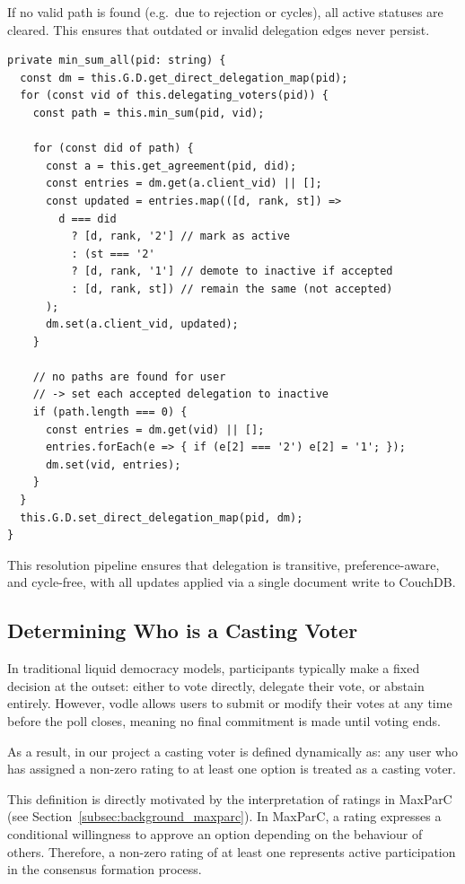 If no valid path is found (e.g.\ due to rejection or cycles), all active statuses are cleared. This ensures that outdated or invalid delegation edges never persist.

\begin{verbatim}
private min_sum_all(pid: string) {
  const dm = this.G.D.get_direct_delegation_map(pid);
  for (const vid of this.delegating_voters(pid)) {
    const path = this.min_sum(pid, vid);

    for (const did of path) {
      const a = this.get_agreement(pid, did);
      const entries = dm.get(a.client_vid) || [];
      const updated = entries.map(([d, rank, st]) =>
        d === did
          ? [d, rank, '2'] // mark as active
          : (st === '2'
          ? [d, rank, '1'] // demote to inactive if accepted
          : [d, rank, st]) // remain the same (not accepted)
      );
      dm.set(a.client_vid, updated);
    }

    // no paths are found for user
    // -> set each accepted delegation to inactive
    if (path.length === 0) {
      const entries = dm.get(vid) || [];
      entries.forEach(e => { if (e[2] === '2') e[2] = '1'; });
      dm.set(vid, entries);
    }
  }
  this.G.D.set_direct_delegation_map(pid, dm);
}
\end{verbatim}

This resolution pipeline ensures that delegation is transitive, preference-aware, and cycle-free, with all updates applied via a single document write to CouchDB.

\subsection{Determining Who is a Casting Voter}

In traditional liquid democracy models, participants typically make a fixed decision at the outset: either to vote directly, delegate their vote, or abstain entirely. However, vodle allows users to submit or modify their votes at any time before the poll closes, meaning no final commitment is made until voting ends.

As a result, in our project a casting voter is defined dynamically as: any user who has assigned a non-zero rating to at least one option is treated as a casting voter.

This definition is directly motivated by the interpretation of ratings in MaxParC (see Section~\ref{subsec:background_maxparc}). In MaxParC, a rating expresses a conditional willingness to approve an option depending on the behaviour of others. Therefore, a non-zero rating of at least one represents active participation in the consensus formation process.

